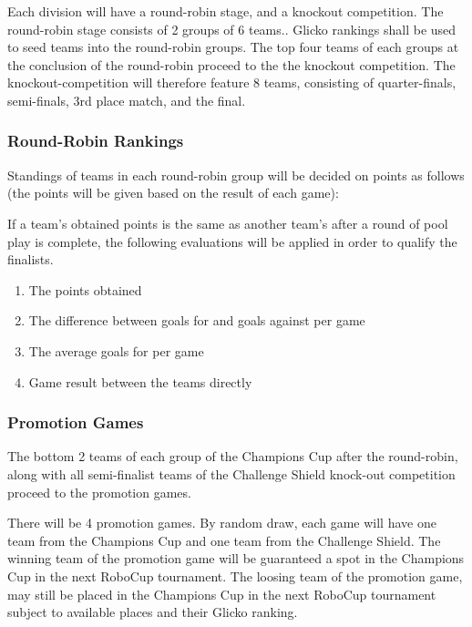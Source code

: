 Each division will have a round-robin stage, and a knockout competition. The round-robin stage consists of 2 groups of 6 teams.. Glicko rankings shall be used to seed teams into the round-robin groups. The top four teams of each groups at the conclusion of the round-robin proceed to the the knockout competition.  The knockout-competition will therefore feature 8 teams, consisting of quarter-finals, semi-finals, 3rd place match, and the final.

\subsubsection{Round-Robin Rankings}
\label{sec:round-robin-rankings}

Standings of teams in each round-robin group will be decided on points as follows (the points will be given based on the result of each game):


If a team's obtained points is the same as another team's after a round of pool play is complete, the following evaluations will be applied in order to qualify the finalists.
\begin{enumerate}

\item The points obtained

\item The difference between goals for and goals against per game

\item The average goals for per game

\item Game result between the teams directly

\end{enumerate}

\subsubsection{Promotion Games}

The bottom 2 teams of each group of the Champions Cup after the round-robin, along with all semi-finalist teams of the Challenge Shield knock-out competition proceed to the promotion games.

There will be 4 promotion games. By random draw, each game will have one team from the Champions Cup and one team from the Challenge Shield. The winning team of the promotion game will be guaranteed a spot in the Champions Cup in the next RoboCup tournament. The loosing team of the promotion game, may still be placed in the Champions Cup in the next RoboCup tournament subject to available places and their Glicko ranking.


